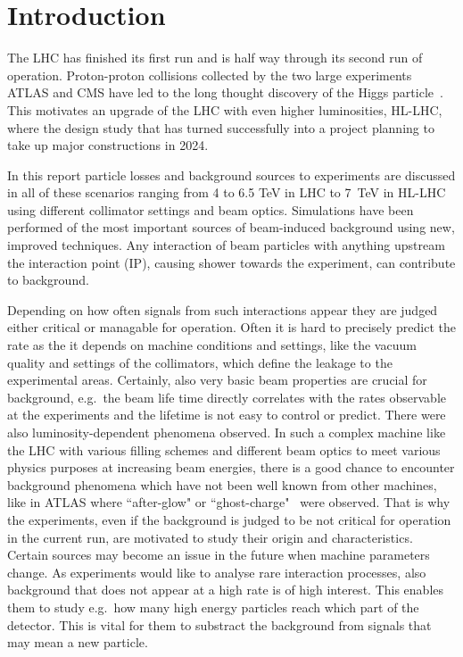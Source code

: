 \section{Introduction}


The LHC has finished its first run and is half way through its second run of operation. Proton-proton collisions collected by the two large experiments ATLAS and CMS have led to the long thought discovery of the Higgs particle~\cite{Aad20121,Chatrchyan201230}. This motivates an upgrade of the LHC with even higher luminosities, HL-LHC, where the design study that has turned successfully into a project planning to take up major constructions in 2024.

In this report particle losses and background sources to experiments are discussed in all of these scenarios ranging from 4 to 6.5 TeV in LHC to 7~TeV in HL-LHC using different collimator settings and beam optics. Simulations have been performed of the most important sources of beam-induced background using new, improved techniques. Any interaction of beam particles with anything upstream the interaction point (IP), causing shower towards the experiment, can contribute to background.

Depending on how often signals from such interactions appear they are judged either critical or managable for operation. Often it is hard to precisely predict the rate as the it depends on machine conditions and settings, like the vacuum quality and settings of the collimators, which define the leakage to the experimental areas. Certainly, also very basic beam properties are crucial for background, e.g.~the beam life time directly correlates with the rates observable at the experiments and the lifetime is not easy to control or predict. There were also luminosity-dependent phenomena observed. In such a complex machine like the LHC with various filling schemes and different beam optics to meet various physics purposes at increasing beam energies, there is a good chance to encounter background phenomena which have not been well known from other machines, like in ATLAS where ``after-glow" or ``ghost-charge"~\cite{ATLAS_JINST_13} were observed. That is why the experiments, even if the background is judged to be not critical for operation in the current run, are motivated to study their origin and characteristics. Certain sources may become an issue in the future when machine parameters change. As experiments would like to analyse rare interaction processes, also background that does not appear at a high rate is of high interest. This enables them to study e.g.~how many high energy particles reach which part of the detector. This is vital for them to substract the background from signals that may mean a new particle. 

